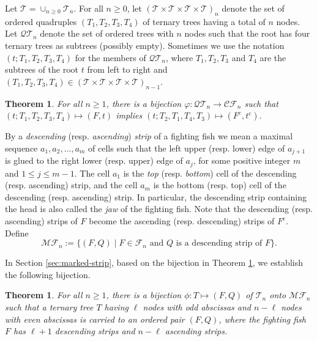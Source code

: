 \documentclass[a4paper,11pt,reqno]{amsart}
\newtheorem{thm}[lem]{Theorem}
\theoremstyle{definition}
\numberwithin{equation}{section}
\newcommand{\cc}{{\mathrm{c}}}
\newcommand{\MF}{{\mathcal{MF}}}
\newcommand{\CF}{{\mathcal{CF}}}
\newcommand{\QT}{{\mathcal{QT}}}
\newcommand{\F}{{\mathcal{F}}}
\newcommand{\T}{{\mathcal{T}}}
\begin{document}
Let $\T=\cup_{n\ge 0} \T_n$. For all $n\ge 0$, let $(\T\times \T\times \T\times \T)_n$ denote the set of ordered quadruples $(T_1,T_2,T_3,T_4)$ of ternary trees having a total of $n$ nodes. Let $\QT_n$ denote the set of ordered trees with $n$ nodes such that the root has four ternary trees as subtrees (possibly empty). Sometimes we use the notation $(t;T_1,T_2,T_3,T_4)$ for the members of $\QT_n$, where $T_1,T_2,T_3$ and $T_4$ are the subtrees of the root $t$ from left to right and $(T_1,T_2,T_3,T_4)\in(\T\times \T\times \T\times \T)_{n-1}$. 



\begin{thm} \label{thm:fighting-fish-marked-stem-cell}
For all $n\ge 1$, there is a bijection $\varphi:\QT_n\rightarrow\CF_n$ such that $(t;T_1,T_2,T_3,T_4)\mapsto (F,t)$ implies $(t;T_2,T_1,T_4,T_3)\mapsto (F^{\cc},t^{\cc})$.
\end{thm}


By a \emph{descending} (resp. \emph{ascending}) \emph{strip} of a fighting fish we mean a maximal sequence $a_1, a_2, \dots, a_m$ of cells such that the left upper (resp. lower) edge of $a_{j+1}$ is glued to the right lower (resp. upper) edge of $a_j$, for some positive integer $m$ and $1\le j\le m-1$. The cell $a_1$ is the \emph{top} (resp. \emph{bottom}) cell of the descending (resp. ascending) strip, and the cell $a_m$ is the bottom (resp. top) cell of the descending (resp. ascending) strip.
In particular, the descending strip containing the head is also called the \emph{jaw} of the fighting fish. 
Note that the descending (resp. ascending) strips of $F$ become the ascending (resp. descending) strips of $F^{\cc}$. 
Define
\begin{equation*}
\MF_n:=\{(F,Q)\mid F\in\F_n \mbox{ and $Q$ is a descending strip of $F$}\}.
\end{equation*} 



In Section \ref{sec:marked-strip}, based on the bijection in Theorem \ref{thm:fighting-fish-marked-stem-cell}, we establish the following bijection. 


\begin{thm} \label{thm:TT-to-marked-fish} 
For all $n\ge 1$, there is a bijection $\phi: T\mapsto (F,Q)$ of $\T_n$ onto $\MF_n$ such that a ternary tree $T$ having $\ell$ nodes with odd abscissas and $n-\ell$ nodes with even abscissas is carried to an ordered pair $(F,Q)$, where the fighting fish $F$ has $\ell+1$ descending strips and $n-\ell$ ascending strips.
\end{thm}
\end{document}
